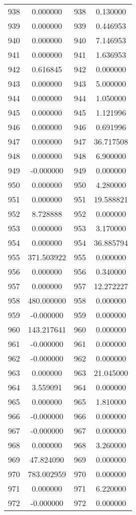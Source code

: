 \documentclass[12pt]{article}
\begin{document}
\begin{longtable}{@{}cccc@{}}
938 & 0.000000 & 938 & 0.130000 \\
939 & 0.000000 & 939 & 0.446953 \\
940 & 0.000000 & 940 & 7.146953 \\
941 & 0.000000 & 941 & 1.636953 \\
942 & 0.616845 & 942 & 0.000000 \\
943 & 0.000000 & 943 & 5.000000 \\
944 & 0.000000 & 944 & 1.050000 \\
945 & 0.000000 & 945 & 1.121996 \\
946 & 0.000000 & 946 & 0.691996 \\
947 & 0.000000 & 947 & 36.717508 \\
948 & 0.000000 & 948 & 6.900000 \\
949 & -0.000000 & 949 & 0.000000 \\
950 & 0.000000 & 950 & 4.280000 \\
951 & 0.000000 & 951 & 19.588821 \\
952 & 8.728888 & 952 & 0.000000 \\
953 & 0.000000 & 953 & 3.170000 \\
954 & 0.000000 & 954 & 36.885794 \\
955 & 371.503922 & 955 & 0.000000 \\
956 & 0.000000 & 956 & 0.340000 \\
957 & 0.000000 & 957 & 12.272227 \\
958 & 480.000000 & 958 & 0.000000 \\
959 & -0.000000 & 959 & 0.000000 \\
960 & 143.217641 & 960 & 0.000000 \\
961 & -0.000000 & 961 & 0.000000 \\
962 & -0.000000 & 962 & 0.000000 \\
963 & 0.000000 & 963 & 21.045000 \\
964 & 3.559091 & 964 & 0.000000 \\
965 & 0.000000 & 965 & 1.810000 \\
966 & -0.000000 & 966 & 0.000000 \\
967 & -0.000000 & 967 & 0.000000 \\
968 & 0.000000 & 968 & 3.260000 \\
969 & 47.824090 & 969 & 0.000000 \\
970 & 783.002959 & 970 & 0.000000 \\
971 & 0.000000 & 971 & 6.220000 \\
972 & -0.000000 & 972 & 0.000000 \\

\end{longtable}
\end{document}
